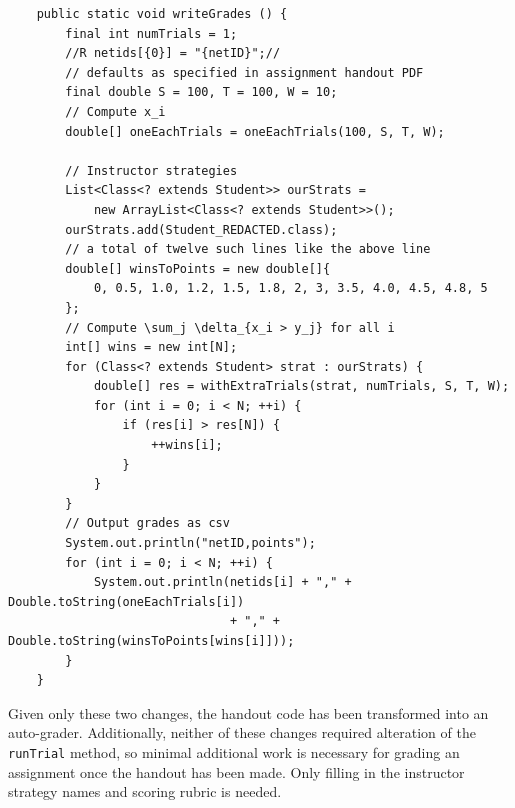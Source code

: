 \documentclass[pageno]{jpaper}
\begin{document}
\begin{verbatim}
    public static void writeGrades () {
        final int numTrials = 1;
        //R netids[{0}] = "{netID}";//
        // defaults as specified in assignment handout PDF
        final double S = 100, T = 100, W = 10;
        // Compute x_i
        double[] oneEachTrials = oneEachTrials(100, S, T, W);

        // Instructor strategies
        List<Class<? extends Student>> ourStrats =
            new ArrayList<Class<? extends Student>>();
        ourStrats.add(Student_REDACTED.class);
        // a total of twelve such lines like the above line
        double[] winsToPoints = new double[]{
            0, 0.5, 1.0, 1.2, 1.5, 1.8, 2, 3, 3.5, 4.0, 4.5, 4.8, 5
        };
        // Compute \sum_j \delta_{x_i > y_j} for all i
        int[] wins = new int[N];
        for (Class<? extends Student> strat : ourStrats) {
            double[] res = withExtraTrials(strat, numTrials, S, T, W);
            for (int i = 0; i < N; ++i) {
                if (res[i] > res[N]) {
                    ++wins[i];
                }
            }
        }
        // Output grades as csv
        System.out.println("netID,points");
        for (int i = 0; i < N; ++i) {
            System.out.println(netids[i] + "," + Double.toString(oneEachTrials[i])
                               + "," + Double.toString(winsToPoints[wins[i]]));
        }
    }
\end{verbatim}
Given only these two changes, the handout code has been transformed into an auto-grader.
Additionally, neither of these changes required alteration of the \texttt{runTrial} method, so minimal additional work is necessary for grading an assignment once the handout has been made.
Only filling in the instructor strategy names and scoring rubric is needed.
\end{document}
